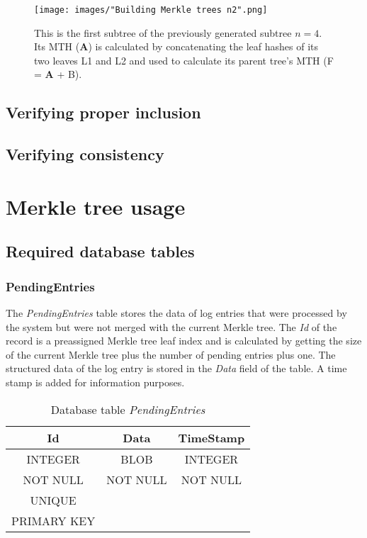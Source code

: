 \documentclass{article}
\begin{document}
		\begin{figure}[H]
			\centering
			\caption{This is the first subtree of the previously generated subtree $ n=4 $. Its MTH (\textbf{A}) is calculated by concatenating the leaf hashes of its two leaves L1 and L2 and used to calculate its parent tree's MTH (F = \textbf{A} + B).}
			\texttt{[image: images/"Building Merkle trees n2".png]}
		\end{figure}

	
	\subsection{Verifying proper inclusion}
	
	\subsection{Verifying consistency}

\section{Merkle tree usage}

	\subsection{Required database tables}
	
	\subsubsection{PendingEntries}
	
	The \textit{PendingEntries} table stores the data of log entries that were processed by the system but were not merged with the current Merkle tree. The \textit{Id} of the record is a preassigned Merkle tree leaf index and is calculated by getting the size of the current Merkle tree plus the number of pending entries plus one. The structured data of the log entry is stored in the \textit{Data} field of the table. A time stamp is added for information purposes.
	
	\begin{table}[H]
		\centering
		\caption{Database table \textit{PendingEntries}}
		\label{pendingEntriesDbTable1}
		\begin{tabular}{|c|c|c|} \hline
			\textbf{Id}	& \textbf{Data}  & \textbf{TimeStamp} \\ \hline
			 INTEGER & BLOB & INTEGER \\ \hline
			 NOT NULL & NOT NULL & NOT NULL\\
			 UNIQUE && \\
			 PRIMARY KEY && \\ \hline
		\end{tabular}
	\end{table}
\end{document}
